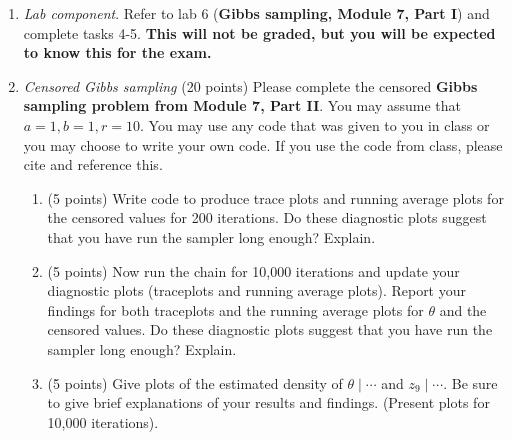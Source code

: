 \documentclass{article}
\begin{document}
\begin{enumerate}
\item \emph{Lab component}. Refer to lab 6 (\textbf{Gibbs sampling, Module 7, Part I}) and complete tasks 4-5. \textbf{This will not be graded, but you will be expected to know this for the exam.}

\item \emph{Censored Gibbs sampling} (20 points) Please complete the censored \textbf{Gibbs sampling problem from Module 7, Part II}. You may assume that $a=1,b=1, r=10.$ You may use any code that was given to you in class or you may choose to write your own code. If you use the code from class, please cite and reference this.

\begin{enumerate}
\item (5 points) Write code to produce trace plots and running average plots for the censored values for 200 iterations. Do these diagnostic plots suggest that you have run the sampler long enough? Explain. 

\item (5 points) Now run the chain for 10,000 iterations  and update your diagnostic plots (traceplots and running average plots). Report your findings for both traceplots and the running average plots for $\theta$ and the censored values. Do these diagnostic plots suggest that you have run the sampler long enough? Explain. 

\item (5 points) Give plots of the estimated density of $\theta \mid \cdots$ and $z_9 \mid \cdots$. Be sure to give brief explanations of your results and findings. (Present plots for 10,000 iterations). 


\end{enumerate}
\end{enumerate}
\end{document}
